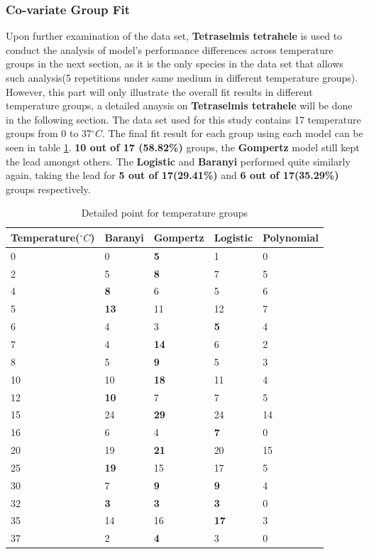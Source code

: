\documentclass[11pt]{article}
\begin{document}
\subsubsection{ Co-variate Group Fit}
Upon further examination of the data set, \textbf{Tetraselmis tetrahele} is used to conduct the analysis of model's performance differences across temperature groups in the next section, as it is the only species in the data set that allows such analysis(5 repetitions under same medium in different temperature groups). However, this part will only illustrate the overall fit results in different temperature groups, a detailed anaysis on \textbf{Tetraselmis tetrahele} will be done in the following section. The data set used for this study contains 17 temperature groups from 0 to 37$^\circ C$. The final fit result for each group using each model can be seen in table \ref{tab: tempfit}. \textbf{10 out of 17 (58.82\%)} groups, the \textbf{Gompertz} model still kept the lead amongst others. The \textbf{Logistic} and \textbf{Baranyi} performed quite similarly again, taking the lead for \textbf{5 out of 17(29.41\%)} and \textbf{6 out of 17(35.29\%)} groups respectively. 
\begin{table}[!htbp]
\begin{tabularx}{\linewidth}{X X X X X}
\toprule  Temperature($^\circ C$) & Baranyi & Gompertz & Logistic & Polynomial \\
\midrule
0 & 0 & \textbf{5} & 1 & 0  \\
2 & 5 & \textbf{8} & 7 & 5  \\
4 & \textbf{8} & 6 & 5 & 6  \\
5 & \textbf{13} & 11 & 12 & 7  \\
6 & 4 & 3 & \textbf{5} & 4  \\
7 & 4 & \textbf{14} & 6 & 2   \\
8 & 5 & \textbf{9} & 5 & 3  \\
10 & 10 & \textbf{18} & 11 & 4  \\
12 & \textbf{10} & 7 & 7 & 5  \\
15 & 24 & \textbf{29} & 24 & 14  \\
16 & 6 & 4 & \textbf{7} & 0  \\
20 & 19 & \textbf{21} & 20 & 15  \\
25 & \textbf{19} & 15 & 17 & 5  \\
30 & 7 & \textbf{9} & \textbf{9} & 4  \\
32 & \textbf{3} & \textbf{3} & \textbf{3} & 0  \\
35 & 14 & 16 & \textbf{17} & 3  \\
37 & 2 & \textbf{4} & 3 & 0  \\
\bottomrule
\end{tabularx}
\caption{Detailed point for temperature groups}
\label{tab: tempfit}
\end{table}          
\FloatBarrier
\end{document}
